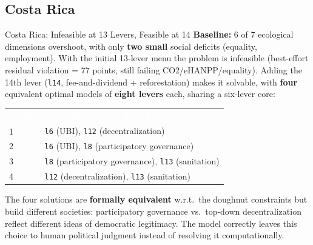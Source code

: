 \documentclass[11pt,aspectratio=169]{beamer}
\newcommand{\tblhead}[1]{\textcolor{white}{\textbf{#1}}}
\begin{document}
\subsection{Costa Rica}
\begin{frame}{Costa Rica: Infeasible at 13 Levers, Feasible at 14}
  \footnotesize
  \textbf{Baseline:} \alert{6 of 7} ecological dimensions overshoot, with only \textbf{two small} social deficits (equality, employment). With the initial 13-lever menu the problem is \alert{infeasible} (best-effort residual violation = 77 points, still failing CO2/eHANPP/equality). Adding the 14th lever (\texttt{l14}, fee-and-dividend + reforestation) makes it \alert{solvable}, with \textbf{four} equivalent optimal models of \textbf{eight levers} each, sharing a six-lever core:
  \renewcommand{\arraystretch}{1.15}
  \begin{tabular}{@{}p{1.3cm}p{9.7cm}@{}}
    \rowcolor{doughnutblue} \tblhead{Model} & \tblhead{Core (\texttt{l1, l2, l3, l5, l9, l14}) $+$ two of} \\
    1 & \texttt{l6} (UBI), \texttt{l12} (decentralization) \\
    2 & \texttt{l6} (UBI), \texttt{l8} (participatory governance) \\
    3 & \texttt{l8} (participatory governance), \texttt{l13} (sanitation) \\
    4 & \texttt{l12} (decentralization), \texttt{l13} (sanitation) \\
  \end{tabular}

  The four solutions are \textbf{formally equivalent} w.r.t.\ the doughnut constraints but build \alert{different societies}: participatory governance vs.\ top-down decentralization reflect different ideas of democratic legitimacy. The model correctly leaves this choice to human political judgment instead of resolving it computationally.
\end{frame}
\end{document}
